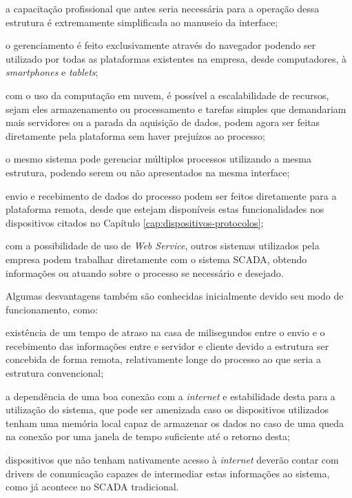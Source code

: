 \begin{alineascomponto}
    \item a capacitação profissional que antes seria necessária para a operação dessa estrutura é extremamente simplificada ao manuseio da interface;
    \item o gerenciamento é feito exclusivamente através do navegador podendo ser utilizado por todas as plataformas existentes na empresa, desde computadores, à \textit{smartphones} e \textit{tablets};
    \item com o uso da computação em nuvem, é possível a escalabilidade de recursos, sejam eles armazenamento ou processamento e tarefas simples que demandariam mais servidores ou a parada da aquisição de dados, podem agora ser feitas diretamente pela plataforma sem haver prejuízos ao processo;
    \item o mesmo sistema pode gerenciar múltiplos processos utilizando a mesma estrutura, podendo serem ou não apresentados na mesma interface;
    \item envio e recebimento de dados do processo podem ser feitos diretamente para a plataforma remota, desde que estejam disponíveis estas funcionalidades nos dispositivos citados no Capítulo \ref{cap:dispositivos-protocolos};
    \item com a possibilidade de uso de \textit{Web Service}, outros sistemas utilizados pela empresa podem trabalhar diretamente com o sistema \gls{SCADA}, obtendo informações ou atuando sobre o processo se necessário e desejado.
\end{alineascomponto}

Algumas desvantagens também são conhecidas inicialmente devido seu modo de funcionamento, como:

\begin{alineascomponto}
    \item existência de um tempo de atraso na casa de milisegundos entre o envio e o recebimento das informações entre e servidor e cliente devido a estrutura ser concebida de forma remota, relativamente longe do processo ao que seria a estrutura convencional;
    \item a dependência de uma boa conexão com a \textit{internet} e estabilidade desta para a utilização do sistema, que pode ser amenizada caso os dispositivos utilizados tenham uma memória local capaz de armazenar os dados no caso de uma queda na conexão por uma janela de tempo suficiente até o retorno desta;
    \item dispositivos que não tenham nativamente acesso à \textit{internet} deverão contar com drivers de comunicação capazes de intermediar estas informações ao sistema, como já acontece no \gls{SCADA} tradicional.

\end{alineascomponto}



